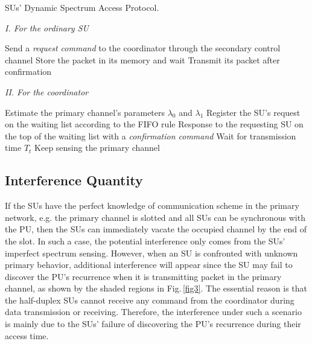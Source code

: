 \documentclass[11pt,draftcls]{IEEEtran}{\onecolumn}
\begin{document}
{\renewcommand\baselinestretch{1.2}\selectfont
\begin{algorithm}[!t] \caption{SUs' Dynamic Spectrum
Access Protocol.} \vspace{2mm}\emph{I. For the ordinary SU}
\begin{algorithmic}[1]\label{algorithm1}
\small{}
    \STATE {\textbullet} Send a \emph{request command} to the coordinator through the secondary control channel
        \STATE {\textbullet} Store the packet in its memory and wait
    \ENDWHILE
    \STATE {\textbullet} Transmit its packet after confirmation
\ENDIF
\end{algorithmic}
\emph{II. For the coordinator}
\begin{algorithmic}[1]
\small\STATE {\textbullet} Estimate the primary channel's parameters
$\lambda_0$ and $\lambda_1$ 
    \STATE {\textbullet} Register the SU's request on the waiting list according to the FIFO rule \ENDIF {}
    \STATE {\textbullet} Response to the requesting SU on the top of the waiting list with a \emph{confirmation command}
    \STATE {\textbullet} Wait for transmission time $T_t$
\ENDWHILE \STATE {\textbullet} Keep sensing the primary channel
\end{algorithmic}
\end{algorithm}
\par}

\subsection{Interference Quantity}\label{interference}

If the SUs have the perfect knowledge of communication scheme in the
primary network, e.g. the primary channel is slotted and all SUs can
be synchronous with the PU, then the SUs can immediately vacate the
occupied channel by the end of the slot. In such a case, the
potential interference only comes from the SUs' imperfect spectrum
sensing. However, when an SU is confronted with unknown primary
behavior, additional interference will appear since the SU may fail
to discover the PU's recurrence when it is transmitting packet in
the primary channel, as shown by the shaded regions in
Fig.\,\ref{fig3}. The essential reason is that the half-duplex SUs
cannot receive any command from the coordinator during data
transmission or receiving. Therefore, the interference under such a
scenario is mainly due to the SUs' failure of discovering the PU's
recurrence during their access time.
\end{document}
